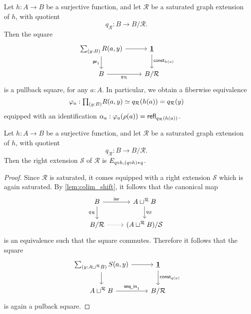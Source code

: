 \begin{cor}
Let $h:A\to B$ be a surjective function, and let $\mathcal{R}$ be a saturated graph extension of $h$, with quotient
\begin{equation*}
q_{\mathcal{R}}:B\to B/\mathcal{R}.
\end{equation*}
Then the square
\begin{equation*}
\begin{tikzcd}
\sm{y:B}R(a,y) \arrow[r] \arrow[d,swap,"\proj 1"] & \unit \arrow[d,"\mathsf{const}_{h(a)}"] \\
B \arrow[r,swap,"q_{\mathcal{R}}"] & B/\mathcal{R}
\end{tikzcd}
\end{equation*}
is a pullback square, for any $a:A$. In particular, we obtain a fiberwise equivalence
\begin{equation*}
\varphi_{a} : \prd{y:B} R(a,y) \eqvsym q_{\mathcal{R}}(h(a))=q_{\mathcal{R}}(y)
\end{equation*}
equipped with an identification $\alpha_a:\varphi_a(\rho(a))=\mathsf{refl}_{q_{\mathcal{R}}(h(a))}$.
\end{cor}

\begin{prp}
Let $h:A\to B$ be a surjective function, and let $\mathcal{R}$ be a saturated graph extension of $h$, with quotient
\begin{equation*}
q_{\mathcal{R}}:B\to B/\mathcal{R}.
\end{equation*}
Then the right extension $\mathcal{S}$ of $\mathcal{R}$ is $E_{q\circ h,{(q\circ h)}\ast_{}{q}}$. 
\end{prp}

\begin{proof}
Since $\mathcal{R}$ is saturated, it comes equipped with a right extension $\mathcal{S}$ which is again saturated. 
By \cref{lem:colim_shift}, it follows that the canonical map
\begin{equation*}
\begin{tikzcd}
B \arrow[d,swap,"q_{\mathcal{R}}"] \arrow[r,"\inr"] & A\sqcup^{\mathcal{R}} B \arrow[d,"q_{\mathcal{S}}"] \\
B/\mathcal{R} \arrow[r,densely dotted] & (A\sqcup^{\mathcal{R}} B)/\mathcal{S}
\end{tikzcd}
\end{equation*}
is an equivalence such that the square commutes. Therefore it follows that the square
\begin{equation*}
\begin{tikzcd}
\sm{y:A\sqcup^{\mathcal{R}} B} S(a,y) \arrow[d] \arrow[r] & \unit \arrow[d,"\mathsf{const}_{q(a)}"] \\
A\sqcup^{\mathcal{R}} B \arrow[r,"\mathsf{seq\usc{}in}_1"] & B/\mathcal{R}
\end{tikzcd}
\end{equation*}
is again a pulback square.
\end{proof}

